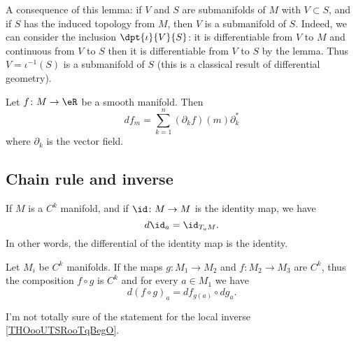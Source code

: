 A consequence of this lemma: if $V$ and $S$ are submanifolds of $M$ with $V\subset S$, and if $S$ has the induced topology from $M$, then $V$ is a submanifold of $S$. Indeed, we can consider the inclusion $\dpt{\iota}{V}{S}$: it is differentiable from $V$ to $M$ and continuous from $V$ to $S$ then it is differentiable from $V$ to $S$ by the lemma. Thus $V=\iota^{-1}(S)$ is a submanifold of $S$ (this is a classical result of differential geometry).

\begin{proposition}	\label{PROPooNAACooIUMcNw}
	Let \(f \colon M\to \eR  \) be a smooth manifold. Then
	\begin{equation}
		df_m=\sum_{k=1}^n(\partial_kf)(m)\partial^*_k
	\end{equation}
	where \( \partial_k\) is the vector field.
\end{proposition}


\subsection{Chain rule and inverse}

\begin{lemma}       \label{LEMooEGITooXbAPDe}
	If \( M\) is a \( C^k\) manifold, and if \( \id\colon M\to M\) is the identity map, we have
	\begin{equation}
		d\id_a=\id_{T_aM}.
	\end{equation}
	In other words, the differential of the identity map is the identity.
\end{lemma}

\begin{lemma}       \label{LEMooGRRAooXxDMuw}
	Let \( M_i\) be \( C^k\) manifolds. If the maps \( g\colon M_1\to M_2\) and \( f\colon M_2\to M_3 \) are \( C^k\), thus the composition \( f\circ g\) is \( C^k\) and for every \( a\in M_1\) we have
	\begin{equation}
		d(f\circ g)_a=df_{g(a)}\circ dg_a.
	\end{equation}
\end{lemma}

\begin{probleme}	\label{PROBooIRONooNAYXjo}
	I'm not totally sure of the statement for the local inverse \ref{THOooUTSRooTqBegO}.
\end{probleme}


